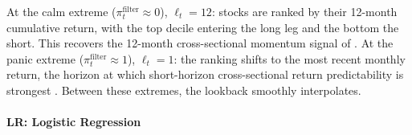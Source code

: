 At the calm extreme ($\pi_t^{\text{filter}} \approx 0$), $\ell_t = 12$: stocks are ranked by their 12-month cumulative return, with the top decile entering the long leg and the bottom the short. This recovers the 12-month cross-sectional momentum signal of \citet{JegadeeshTitman1993}. At the panic extreme ($\pi_t^{\text{filter}} \approx 1$), $\ell_t = 1$: the ranking shifts to the most recent monthly return, the horizon at which short-horizon cross-sectional return predictability is strongest \citep{Jegadeesh1990, Lehmann1990}. Between these extremes, the lookback smoothly interpolates.

\paragraph{LR: Logistic Regression}\label{sec:method1}

